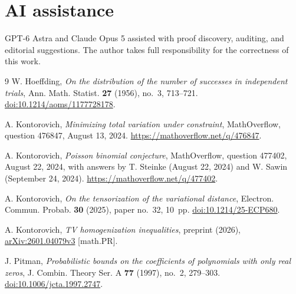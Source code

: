 \documentclass[11pt]{article}
\numberwithin{equation}{section}
\theoremstyle{remark}\newtheorem{remark}[theorem]{Remark}
\begin{document}
\section*{AI assistance}
GPT-6 Astra and Claude Opus 5 assisted with proof discovery, auditing, and
editorial suggestions. The author takes full responsibility for the
correctness of this work.

\begin{samepage}
\begin{thebibliography}{9}
W. Hoeffding, \emph{On the distribution of the number of successes in
independent trials}, Ann. Math. Statist. \textbf{27} (1956), no.~3, 713--721.
\href{https://doi.org/10.1214/aoms/1177728178}{doi:10.1214/aoms/1177728178}.

A. Kontorovich, \emph{Minimizing total variation under constraint},
MathOverflow, question 476847, August 13, 2024.
\url{https://mathoverflow.net/q/476847}.

A. Kontorovich, \emph{Poisson binomial conjecture}, MathOverflow,
question 477402, August 22, 2024, with answers by T. Steinke
(August 22, 2024) and W. Sawin (September 24, 2024).
\url{https://mathoverflow.net/q/477402}.

A. Kontorovich, \emph{On the tensorization of the variational distance},
Electron. Commun. Probab. \textbf{30} (2025), paper no.~32, 10~pp.
\href{https://doi.org/10.1214/25-ECP680}{doi:10.1214/25-ECP680}.

A. Kontorovich, \emph{TV homogenization inequalities}, preprint (2026),
\href{https://arxiv.org/abs/2601.04079v3}{arXiv:2601.04079v3} [math.PR].

J. Pitman, \emph{Probabilistic bounds on the coefficients of polynomials
with only real zeros}, J. Combin. Theory Ser. A \textbf{77} (1997),
no.~2, 279--303.
\href{https://doi.org/10.1006/jcta.1997.2747}{doi:10.1006/jcta.1997.2747}.
\end{thebibliography}
\end{samepage}
\end{document}
